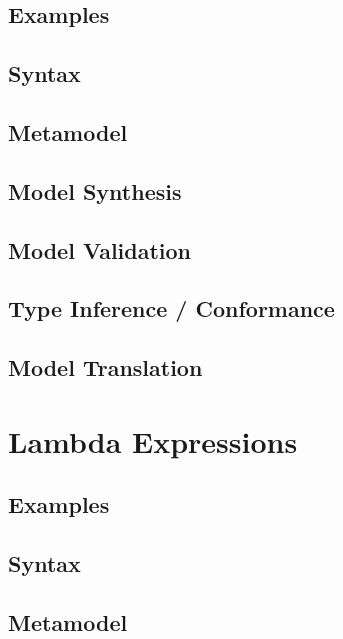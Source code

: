 \documentclass[a4paper,oneside,12pt, extrafontsizes]{memoir}
\begin{document}
    \section{Examples}
    

    \section{Syntax}
    

    \section{Metamodel}

    \section{Model Synthesis}

    \section{Model Validation}

    \section{Type Inference / Conformance}

    \section{Model Translation}

  \chapter{Lambda Expressions}
  \label{ch:lambdas}
  

    \section{Examples}
    

    \section{Syntax}
    

    \section{Metamodel}
\end{document}
